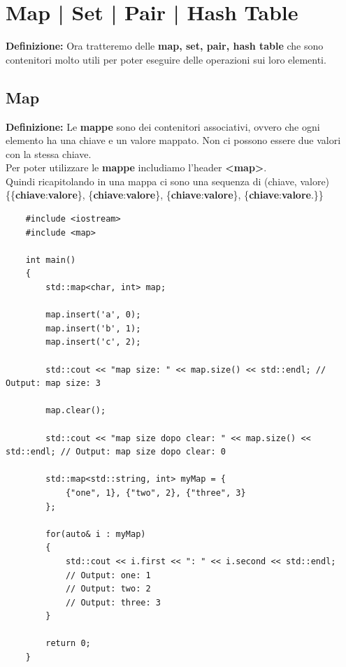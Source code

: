 
\newpage

\section{Map | Set | Pair | Hash Table}

\textsf{\small \textbf{Definizione: } Ora tratteremo delle \textbf{map, set, pair, hash table} che sono contenitori molto utili per poter eseguire delle operazioni sui loro elementi.} \\

\subsection{Map}

\textsf{\small \textbf{Definizione: } Le \textbf{mappe} sono dei contenitori associativi, ovvero che ogni elemento ha una chiave e un valore mappato. Non ci possono essere due valori con la stessa chiave.} \\

\textsf{\small Per poter utilizzare le \textbf{mappe} includiamo l'header \textbf{<map>}.} \\

\textsf{\small Quindi ricapitolando in una mappa ci sono una sequenza di (chiave, valore) \{\{\textbf{chiave}:\textbf{valore}\}, \{\textbf{chiave}:\textbf{valore}\}, \{\textbf{chiave}:\textbf{valore}\}, \{\textbf{chiave}:\textbf{valore}.\}\}} \\

\begin{lstlisting}
	#include <iostream>
	#include <map>
	
	int main()
	{
		std::map<char, int> map;
		
		map.insert('a', 0);
		map.insert('b', 1);
		map.insert('c', 2);
		
		std::cout << "map size: " << map.size() << std::endl; // Output: map size: 3
		
		map.clear();
		
		std::cout << "map size dopo clear: " << map.size() << std::endl; // Output: map size dopo clear: 0
		
		std::map<std::string, int> myMap = {
			{"one", 1}, {"two", 2}, {"three", 3}
		};
	
		for(auto& i : myMap)
		{
			std::cout << i.first << ": " << i.second << std::endl;
			// Output: one: 1
			// Output: two: 2
			// Output: three: 3
		}
		
		return 0;
	}
\end{lstlisting}

